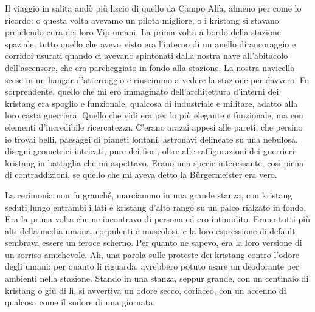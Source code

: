 Il viaggio in salita andò più liscio di quello da Campo Alfa, almeno per
come lo ricordo: o questa volta avevamo un pilota migliore, o i kristang
si stavano prendendo cura dei loro Vip umani. La prima volta a bordo
della stazione spaziale, tutto quello che avevo visto era l'interno di
un anello di ancoraggio e corridoi usurati quando ci avevano spintonati
dalla nostra nave all'abitacolo dell'ascensore, che era parcheggiato in
fondo alla stazione. La nostra navicella scese in un hangar
d'atterraggio e riuscimmo a vedere la stazione per davvero. Fu
sorprendente, quello che mi ero immaginato dell'architettura d'interni
dei kristang era spoglio e funzionale, qualcosa di industriale e
militare, adatto alla loro casta guerriera. Quello che vidi era per lo
più elegante e funzionale, ma con elementi d'incredibile ricercatezza.
C'erano arazzi appesi alle pareti, che persino io trovai belli, paesaggi
di pianeti lontani, astronavi delineate su una nebulosa, disegni
geometrici intricati, pure dei fiori, oltre alle raffigurazioni dei
guerrieri kristang in battaglia che mi aspettavo. Erano una specie
interessante, così piena di contraddizioni, se quello che mi aveva detto
la Bürgermeister era vero.

La cerimonia non fu granché, marciammo in una grande stanza, con
kristang seduti lungo entrambi i lati e kristang d'alto rango su un
palco rialzato in fondo. Era la prima volta che ne incontravo di persona
ed ero intimidito. Erano tutti più alti della media umana, corpulenti e
muscolosi, e la loro espressione di default sembrava essere un feroce
scherno. Per quanto ne sapevo, era la loro versione di un sorriso
amichevole. Ah, una parola sulle proteste dei kristang contro l'odore
degli umani: per quanto li riguarda, avrebbero potuto usare un
deodorante per ambienti nella stazione. Stando in una stanza, seppur
grande, con un centinaio di kristang o giù di lì, si avvertiva un odore
secco, coriaceo, con un accenno di qualcosa come il sudore di una
giornata.

